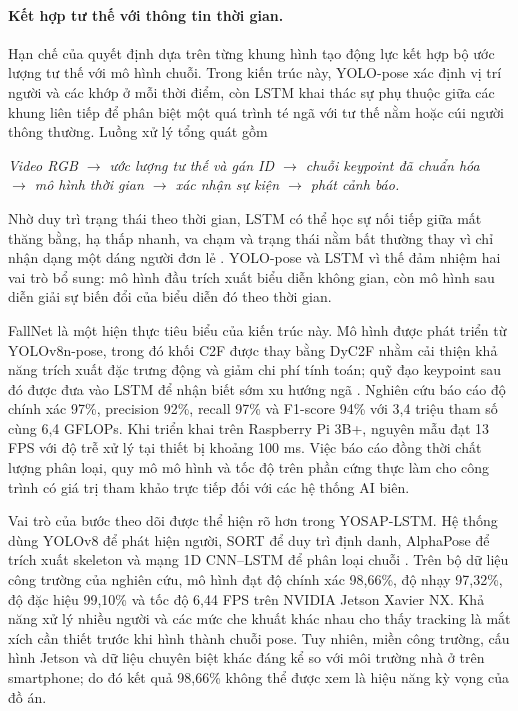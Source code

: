 \paragraph{Kết hợp tư thế với thông tin thời gian.}
Hạn chế của quyết định dựa trên từng khung hình tạo động lực kết hợp bộ ước lượng tư thế với mô hình chuỗi. Trong kiến trúc này, YOLO-pose xác định vị trí người và các khớp ở mỗi thời điểm, còn LSTM khai thác sự phụ thuộc giữa các khung liên tiếp để phân biệt một quá trình té ngã với tư thế nằm hoặc cúi người thông thường. Luồng xử lý tổng quát gồm
\begin{center}
\small
\textit{Video RGB $\rightarrow$ ước lượng tư thế và gán ID $\rightarrow$ chuỗi keypoint đã chuẩn hóa}\\
\textit{$\rightarrow$ mô hình thời gian $\rightarrow$ xác nhận sự kiện $\rightarrow$ phát cảnh báo.}
\end{center}
Nhờ duy trì trạng thái theo thời gian, LSTM có thể học sự nối tiếp giữa mất thăng bằng, hạ thấp nhanh, va chạm và trạng thái nằm bất thường thay vì chỉ nhận dạng một dáng người đơn lẻ . YOLO-pose và LSTM vì thế đảm nhiệm hai vai trò bổ sung: mô hình đầu trích xuất biểu diễn không gian, còn mô hình sau diễn giải sự biến đổi của biểu diễn đó theo thời gian.

FallNet là một hiện thực tiêu biểu của kiến trúc này. Mô hình được phát triển từ YOLOv8n-pose, trong đó khối C2F được thay bằng DyC2F nhằm cải thiện khả năng trích xuất đặc trưng động và giảm chi phí tính toán; quỹ đạo keypoint sau đó được đưa vào LSTM để nhận biết sớm xu hướng ngã . Nghiên cứu báo cáo độ chính xác 97\%, precision 92\%, recall 97\% và F1-score 94\% với 3,4 triệu tham số cùng 6,4 GFLOPs. Khi triển khai trên Raspberry Pi 3B+, nguyên mẫu đạt 13 FPS với độ trễ xử lý tại thiết bị khoảng 100 ms. Việc báo cáo đồng thời chất lượng phân loại, quy mô mô hình và tốc độ trên phần cứng thực làm cho công trình có giá trị tham khảo trực tiếp đối với các hệ thống AI biên.

Vai trò của bước theo dõi được thể hiện rõ hơn trong YOSAP-LSTM. Hệ thống dùng YOLOv8 để phát hiện người, SORT để duy trì định danh, AlphaPose để trích xuất skeleton và mạng 1D CNN--LSTM để phân loại chuỗi . Trên bộ dữ liệu công trường của nghiên cứu, mô hình đạt độ chính xác 98,66\%, độ nhạy 97,32\%, độ đặc hiệu 99,10\% và tốc độ 6,44 FPS trên NVIDIA Jetson Xavier NX. Khả năng xử lý nhiều người và các mức che khuất khác nhau cho thấy tracking là mắt xích cần thiết trước khi hình thành chuỗi pose. Tuy nhiên, miền công trường, cấu hình Jetson và dữ liệu chuyên biệt khác đáng kể so với môi trường nhà ở trên smartphone; do đó kết quả 98,66\% không thể được xem là hiệu năng kỳ vọng của đồ án.


